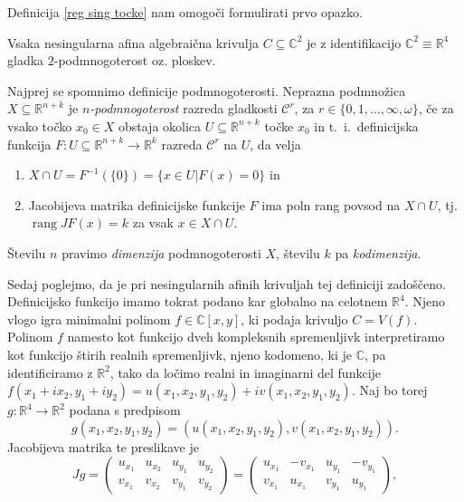 \documentclass[mat1]{fmfdelo}
\newcommand{\tikzmark}[1]{\tikz[overlay,remember picture,baseline=(#1.base)]
\node (#1) {\strut};}
\numberwithin{equation}{section}
\newcommand{\R}{\mathbb R}
\newcommand{\C}{\mathbb C}
\DeclareMathOperator{\rang}{rang}
\theoremstyle{definition}
\begin{document}
Definicija \ref{reg sing tocke} nam omogoči formulirati prvo opazko.

\begin{trditev}
    Vsaka nesingularna afina algebraična krivulja $C \subseteq \C^2$ je z identifikacijo $\C^2 \equiv \R^4$ gladka $2$-podmnogoterost oz. ploskev.
\end{trditev}

\begin{dokaz}
    Najprej se spomnimo definicije podmnogoterosti. Neprazna podmnožica $X \subseteq \R^{n+k}$ je \emph{$n$-podmnogoterost} razreda gladkosti $\mathcal{C}^r$, za $r \in \{0,1,\dots, \infty, \omega\}$, če za vsako točko $x_0 \in X$ obstaja okolica $U \subseteq \R^{n+k}$ točke $x_0$ in t.~i.\ definicijska funkcija $F: U \subseteq \R^{n+k} \to \R^k$ razreda $\mathcal{C}^r$ na $U$, da velja
    \begin{enumerate}
        \item $X \cap U = F^{-1}(\{0\}) = \{x \in U | F(x) = 0\}$ in
        \item Jacobijeva matrika definicijske funkcije $F$ ima poln rang povsod na $X \cap U$, tj. $\rang J F(x) = k$ za vsak $x \in X \cap U$.
    \end{enumerate}
    Številu $n$ pravimo \emph{dimenzija} podmnogoterosti $X$, številu $k$ pa \emph{kodimenzija}.
    \\
    \par
    Sedaj poglejmo, da je pri nesingularnih afinih krivuljah tej definiciji zadoščeno. Definicijsko funkcijo imamo tokrat podano kar globalno na celotnem $\R^4$. Njeno vlogo igra minimalni polinom $f \in \C[x,y]$, ki podaja krivuljo $C = V(f)$. Polinom $f$ namesto kot funkcijo dveh kompleksnih spremenljivk interpretiramo kot funkcijo štirih realnih spremenljivk, njeno kodomeno, ki je $\C$, pa identificiramo z $\R^2$, tako da ločimo realni in imaginarni del funkcije $f(x_1 + ix_2, y_1 + iy_2) = u(x_1,x_2,y_1,y_2) + iv(x_1,x_2,y_1,y_2)$. Naj bo torej $g: \R^4 \to \R^2$ podana s predpisom
    \[
        g(x_1,x_2,y_1,y_2) = (u(x_1,x_2,y_1,y_2), v(x_1,x_2,y_1,y_2)).
    \]
    Jacobijeva matrika te preslikave je
    \[
    Jg = 
    \begin{pmatrix}
        u_{x_1} & u_{x_2} & u_{y_1} & u_{y_2} \\
        v_{x_1} & v_{x_2} & v_{y_1} & v_{y_2}
    \end{pmatrix}
    =
    \begin{pmatrix}
        u_{x_1} & -v_{x_1} & u_{y_1} & -v_{y_1} \\
        v_{x_1} & u_{x_1} & v_{y_1} & u_{y_1}
    \end{pmatrix},
    \]
        

\end{dokaz}
\end{document}
